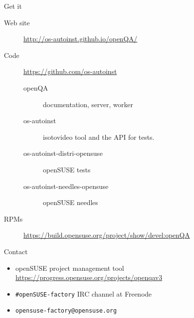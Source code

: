 \documentclass[
]{beamer}
\begin{document}
\begin{frame}{Get it}
  \begin{description}
    \item[Web site] \url{http://os-autoinst.github.io/openQA/}
    \item[Code] \url{https://github.com/os-autoinst}
      \begin{description}
	\item[openQA] documentation, server, worker
	\item[os-autoinst] isotovideo tool and the API for tests.
	\item[os-autoinst-distri-opensuse] openSUSE tests
	\item[os-autoinst-needles-opensuse] openSUSE needles
      \end{description}
    \item[RPMs] \scriptsize{\url{https://build.opensuse.org/project/show/devel:openQA}}
  \end{description}
\end{frame}

\begin{frame}{Contact}
  \begin{itemize}
    \item openSUSE project management tool \url{https://progress.opensuse.org/projects/openqav3}
    \item \texttt{\#openSUSE-factory} IRC channel at Freenode
    \item \texttt{opensuse-factory@opensuse.org}
  \end{itemize}
\end{frame}

{
  \usebackgroundtemplate{}
  
  
  
}


\end{document}
